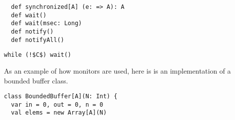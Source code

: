\begin{itemize}

\begin{lstlisting}
  def synchronized[A] (e: => A): A
  def wait()
  def wait(msec: Long)
  def notify()
  def notifyAll()
\end{lstlisting}



\begin{lstlisting}
while (!$C$) wait()
\end{lstlisting}

As an example of how monitors are used, here is is an implementation
of a bounded buffer class.
\begin{lstlisting}
class BoundedBuffer[A](N: Int) {
  var in = 0, out = 0, n = 0
  val elems = new Array[A](N)


\end{lstlisting}
\end{itemize}

